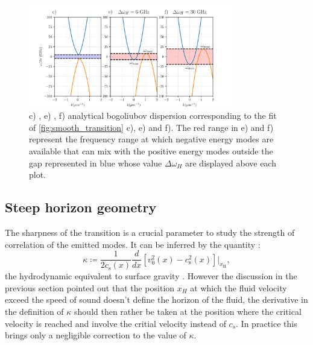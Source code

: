 \begin{figure}
    \centering
    \includegraphics[width=0.8\textwidth]{chap3_custom_st/fig/max_freq_hawking.pdf}
    \caption{c) , e) , f) analytical bogoliubov dispersion corresponding to the fit of \autoref{fig:smooth_transition} c), e) and f). The red range in e) and f) represent the frequency range at which negative energy modes
    are available that can mix with the positive energy modes outside the gap represented in blue whose value $\Delta \omega_H$ are displayed above each plot.}
    \label{fig:hawking_range}
\end{figure}

\subsection{Steep horizon geometry}

The sharpness of the transition is a crucial parameter to study the strength of correlation of the emitted modes. It can be inferred by the quantity :
\begin{equation}
    \kappa \coloneqq \frac{1}{2c_\mathrm{s}(x)}\frac{d}{dx}[v^2_0(x)-c^2_\mathrm{s}(x)]|_{x_\mathrm{H}},
    \label{eq:steepness}
\end{equation}
the hydrodynamic equivalent to surface gravity \cite{barcelo_hawking-like_2006}. However the discussion in the previous section 
pointed out that the position $x_H$ at which the fluid velocity exceed the speed of sound doesn't define the horizon of the fluid, the derivative
in the definition of $\kappa$ should then rather be taken at the position where the critical velocity is reached and involve the critial velocity instead of $c_s$.
In practice this brings only a negligible correction to the value of $\kappa$. 

\bigskip

